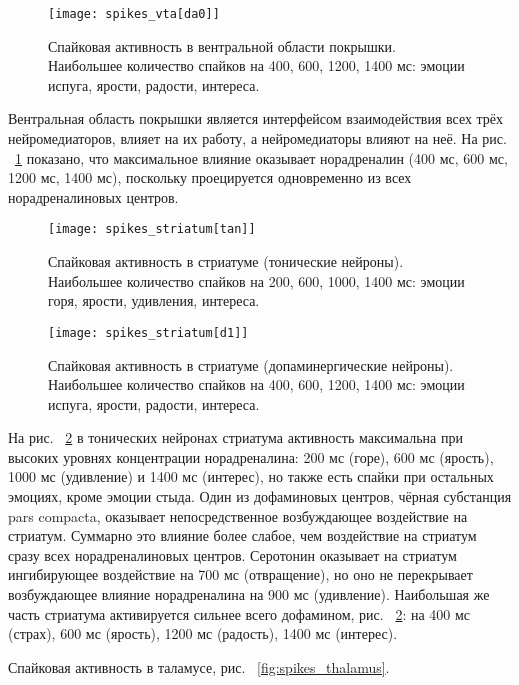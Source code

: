 \begin{figure}
	\centering
	\texttt{[image: spikes\_vta[da0]]}
	\caption{Спайковая активность в вентральной области покрышки. Наибольшее количество спайков на 400, 600, 1200, 1400 мс: эмоции испуга, ярости, радости, интереса.}
	\label{fig:spikes_vta}
\end{figure}

Вентральная область покрышки является интерфейсом взаимодействия всех трёх нейромедиаторов, влияет на их работу, а нейромедиаторы влияют на неё. На рис. ~\ref{fig:spikes_vta} показано, что максимальное влияние оказывает норадреналин (400 мс, 600 мс, 1200 мс, 1400 мс), поскольку проецируется одновременно из всех норадреналиновых центров.

\begin{figure}
	\centering
	\texttt{[image: spikes\_striatum[tan]]}
	\caption{Спайковая активность в стриатуме (тонические нейроны). Наибольшее количество спайков на 200, 600, 1000, 1400 мс: эмоции горя, ярости, удивления, интереса.}
	\label{fig:spikes_striatum}
\end{figure}

\begin{figure}
	\centering
	\texttt{[image: spikes\_striatum[d1]]}
	\caption{Спайковая активность в стриатуме (допаминергические нейроны). Наибольшее количество спайков на 400, 600, 1200, 1400 мс: эмоции испуга, ярости, радости, интереса.}
	\label{fig:spikes_striatumх[d1]}
\end{figure}


На рис. ~\ref{fig:spikes_striatum} в тонических нейронах стриатума активность максимальна при высоких уровнях концентрации норадреналина: 200 мс (горе), 600 мс (ярость), 1000 мс (удивление) и 1400 мс (интерес), но также есть спайки при остальных эмоциях, кроме эмоции стыда. Один из дофаминовых центров, чёрная субстанция pars compacta, оказывает непосредственное возбуждающее воздействие на стриатум. Суммарно это влияние более слабое, чем воздействие на стриатум сразу всех норадреналиновых центров. Серотонин оказывает на стриатум ингибирующее воздействие на 700 мс (отвращение), но оно не перекрывает возбуждающее влияние норадреналина на 900 мс (удивление). Наибольшая же часть стриатума активируется сильнее всего дофамином, рис. ~\ref{fig:spikes_striatum}: на 400 мс (страх), 600 мс (ярость), 1200 мс (радость), 1400 мс (интерес).


Спайковая активность в таламусе, рис. ~\ref{fig:spikes_thalamus}.

